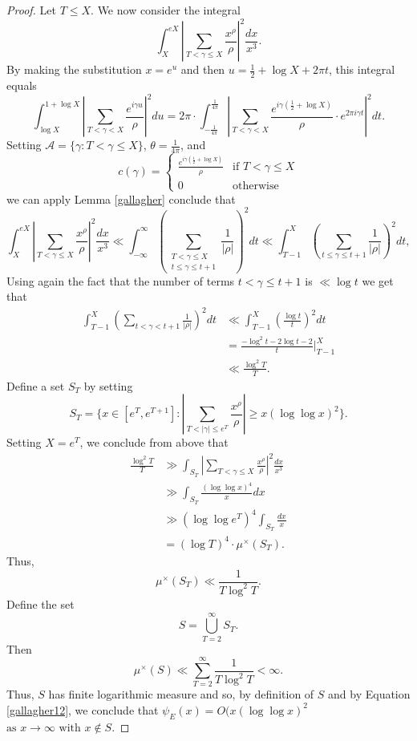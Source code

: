 \documentclass[12pt,reqno]{amsart}
\theoremstyle{definition}
\numberwithin{equation}{section}
\begin{document}
\begin{proof}
Let $T \leq X$. We now consider the integral 
$$
\int_X^{eX} \left| \sum_{T<\gamma \leq X} \frac{x^\rho}{\rho} \right|^2 \frac{dx}{x^3}. 
$$
By making the substitution $x=e^u$ and then $u=\frac{1}{2}+\log X+ 2\pi t$, this integral equals
$$
\int_{\log X}^{1+\log X} \left| \sum_{T<\gamma<X} \frac{e^{i \gamma u}}{\rho} \right|^2 du = 2\pi \cdot  \int_{-\frac{1}{4\pi}}^{\frac{1}{4 \pi} } \left| \sum_{T<\gamma<X} \frac{e^{i \gamma (\frac{1}{2}+\log X) }}{\rho} \cdot e^{2 \pi i \gamma t}  \right|^2 dt. 
$$
Setting $\mathcal A=\{ \gamma: T< \gamma \leq X\}$,  $\theta=\frac{1}{4 \pi }$,
and  \[c(\gamma)= 
\begin{cases}
\frac{e^{i \gamma (\frac{1}{2}+\log X)}}{\rho} & \text{if } T<\gamma \leq X \\
 0& \text{otherwise} 
\end{cases}
\]
we can apply Lemma \ref{gallagher} conclude that 
\begin{equation*}
\int_X^{eX} \left| \sum_{T<\gamma \leq X} \frac{x^\rho}{\rho} \right|^2 \frac{dx}{x^3} \ll \int_{-\infty}^{\infty}  \left( \sum_{\substack{ T <\gamma \leq X \\ t \leq \gamma \leq t+1}} \frac{1}{|\rho|}  \right)^2 dt \ll \int_{T-1}^{X}  \left( \sum_{t \leq \gamma \leq t+1} \frac{1}{|\rho|}  \right)^2 dt,  
\end{equation*}
Using again the fact that the number of terms $t<\gamma \leq t+1$ is $\ll \log t$ we get that 
\begin{align*}
 \int_{T-1}^{X}  \left( \sum_{t<\gamma<t+1} \frac{1}{|\rho|}  \right)^2 dt   & \ll  \int_{T-1}^{X}  \left( \frac{\log t}{t}  \right)^2 dt \\
 &= \frac{-\log ^2 t- 2 \log t-2}{t} \Biggr|_{T-1}^{X} \\
 & \ll \frac{\log ^2 T}{T}. 
\end{align*}
Define a set $S_T$ by setting 
$$
S_T = \{ x \in [e^T, e^{T+1}]: \left| \sum_{T < |\gamma| \leq e^T} \frac{x^\rho}{\rho} \right|  \geq x( \log \log x)^2 \}. 
$$
Setting $X=e^{T}$, we conclude from above that 
\begin{align*}
\frac{\log^2 T}{T} & \gg \int_{S_T} \left| \sum_{T<\gamma \leq X} \frac{x^\rho}{\rho} \right|^2 \frac{dx}{x^3} \\
 & \gg \int_{S_T} \frac{(\log \log x)^4}{x} dx \\
 & \gg  (\log \log e^T)^4 \int_{S_T} \frac{dx}{x} \\
 & =  (\log T)^4 \cdot \mu^{\times}(S_T). 
\end{align*}
Thus, 
$$
\mu^{\times}(S_T) \ll \frac{1}{T \log^2 T}. 
$$
Define the set 
$$
S= \bigcup_{T=2}^{\infty} S_T. 
$$
Then 
$$
\mu^{\times}(S) \ll \sum_{T=2}^{\infty} \frac{1}{T \log^2 T}< \infty. 
$$
Thus, $S$ has finite logarithmic measure and so, by definition of $S$ and by Equation \eqref{gallagher12}, we conclude that $
\psi_E(x)= O(x (\log \log x)^2 $  $\text{as }   x \rightarrow \infty \text{ with } x \not \in S$. 

\end{proof}
\end{document}
